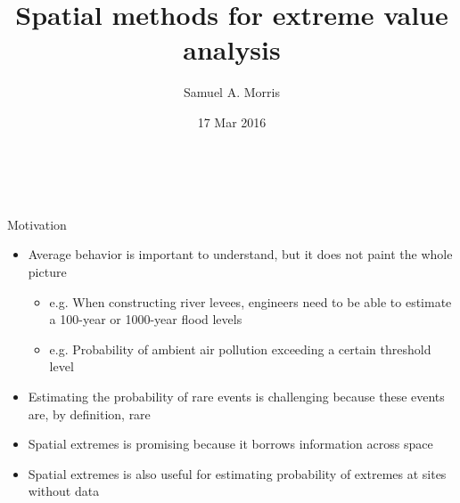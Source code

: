 \documentclass{beamer}
\title[Spatial methods for EVA] %
{
  Spatial methods for extreme value analysis
}
\author[S. Morris]{Samuel A. Morris}
\date[]{17 Mar 2016}
\begin{document}
\begin{frame}\frametitle{\ }
\begin{center}
  \maketitle
\end{center}
\end{frame}

\begin{frame}{Motivation}
  \begin{itemize} \setlength{\itemsep}{1em}
    \item Average behavior is important to understand, but it does not paint the whole picture
    \begin{itemize}
      \item e.g. When constructing river levees, engineers need to be able to estimate a 100-year or 1000-year flood levels
      \item e.g. Probability of ambient air pollution exceeding a certain threshold level
    \end{itemize}
    \item Estimating the probability of rare events is challenging because these events are, by definition, rare
    \item Spatial extremes is promising because it borrows information across space
    \item Spatial extremes is also useful for estimating probability of extremes at sites without data
  \end{itemize}
\end{frame}
\end{document}
